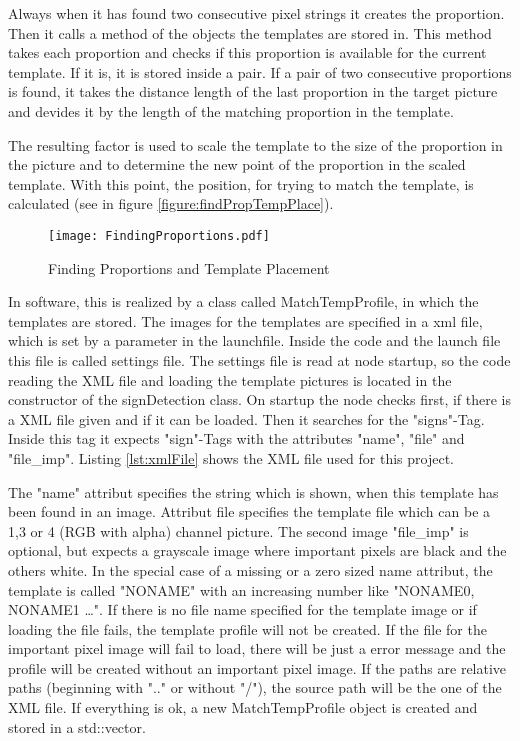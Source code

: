 Always when it has found two consecutive pixel strings it creates the proportion. 
Then it calls a method of the objects the templates are stored in.
This method takes each proportion and checks if this proportion is available for
the current template. If it is, it is stored inside a pair. If a pair of two
consecutive proportions is found, it takes the distance length of the last
proportion in the target picture and devides it by the length of the matching proportion
in the template. 

The resulting factor is used to scale the template to the size of the
proportion in the picture and to determine the new point of the proportion in the scaled template.
With this point, the position, for trying to match the template, is calculated 
(see in figure \vref{figure:findPropTempPlace}).

\begin{figure}[H]
\begin{center}
  \texttt{[image: FindingProportions.pdf]}
  \caption{Finding Proportions and Template Placement}
  \label{figure:findPropTempPlace}
\end{center}
\end{figure} 

In software, this is realized by a class called MatchTempProfile, in which the templates are stored.
The images for the templates are specified in a xml file, which is set by a parameter in the launchfile.
\newpage 
Inside the code and the launch file this file is called settings file. The settings file is read at node startup,
so the code reading the XML file and loading the template pictures is located in the constructor of the
signDetection class. On startup the node checks first, if there is a XML file given and if it can be loaded. 
Then it searches for the "signs"-Tag. Inside this tag it expects "sign"-Tags 
with the attributes "name", "file" and "file\_imp". Listing \vref{lst:xmlFile} shows the XML file used for this project.

The "name" attribut specifies the string which is shown, when this template has been found in an image.
Attribut file specifies the template file which can be a 1,3 or 4 (RGB with alpha) channel picture. 
The second image "file\_imp" is optional, but expects a grayscale image where important pixels are black and the others 
white. In the special case of a missing or a zero sized name attribut, the template is called "NONAME" with an increasing number
like "NONAME0, NONAME1 \ldots". If there is no file name specified for the template image or if loading the file
fails, the template profile will not be created. If the file for the important pixel image will fail to load, there will
be just a error message and the profile will be created without an important pixel image. If the paths are relative paths
(beginning with ".." or without "/"), the source path will be the one of the XML file. If everything is ok, a new 
MatchTempProfile object is created and stored in a std::vector.


